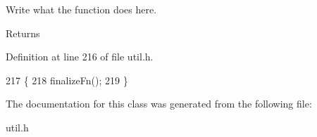 Write what the function does here. 

\begin{DoxyReturn}{Returns}

\end{DoxyReturn}


Definition at line 216 of file util.\+h.


\begin{DoxyCode}
217         \{
218             finalizeFn();
219         \}
\end{DoxyCode}


The documentation for this class was generated from the following file\+:\begin{DoxyCompactItemize}
\item 
util.\+h\end{DoxyCompactItemize}

